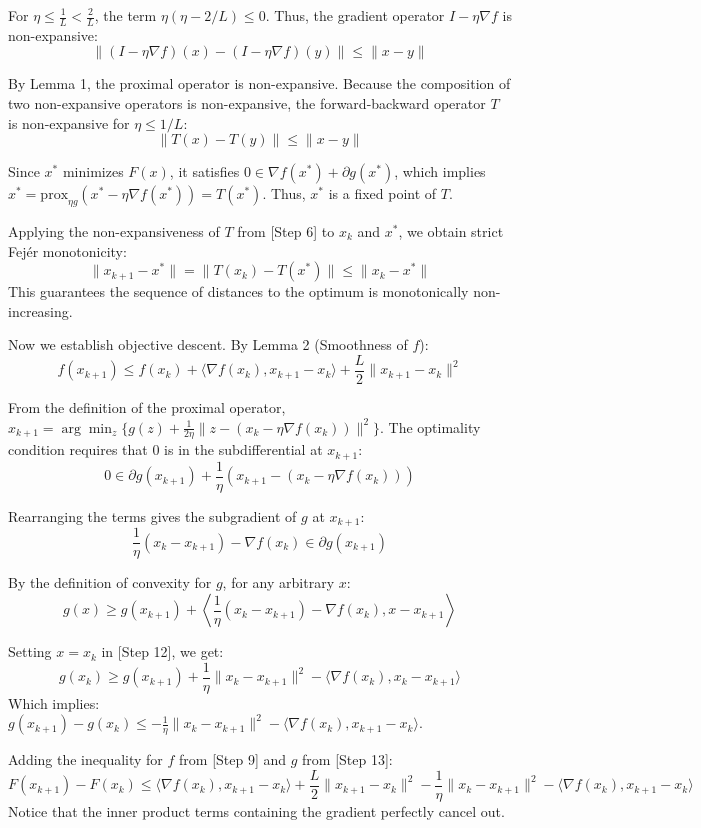 \documentclass[11pt]{article}
\begin{document}
\noindent [Step 5] For $\eta \le \frac{1}{L} < \frac{2}{L}$, the term $\eta(\eta - 2/L) \le 0$. Thus, the gradient operator $I - \eta \nabla f$ is non-expansive:
$$\|(I - \eta \nabla f)(x) - (I - \eta \nabla f)(y)\| \le \|x - y\|$$

\noindent [Step 6] By Lemma 1, the proximal operator is non-expansive. Because the composition of two non-expansive operators is non-expansive, the forward-backward operator $T$ is non-expansive for $\eta \le 1/L$:
$$\|T(x) - T(y)\| \le \|x - y\|$$

\noindent [Step 7] Since $x^*$ minimizes $F(x)$, it satisfies $0 \in \nabla f(x^*) + \partial g(x^*)$, which implies $x^* = \text{prox}_{\eta g}(x^* - \eta \nabla f(x^*)) = T(x^*)$. Thus, $x^*$ is a fixed point of $T$.

\noindent [Step 8] Applying the non-expansiveness of $T$ from [Step 6] to $x_k$ and $x^*$, we obtain strict Fejér monotonicity:
$$\|x_{k+1} - x^*\| = \|T(x_k) - T(x^*)\| \le \|x_k - x^*\|$$
This guarantees the sequence of distances to the optimum is monotonically non-increasing.

\noindent [Step 9] Now we establish objective descent. By Lemma 2 (Smoothness of $f$):
$$f(x_{k+1}) \le f(x_k) + \langle \nabla f(x_k), x_{k+1} - x_k \rangle + \frac{L}{2} \|x_{k+1} - x_k\|^2$$

\noindent [Step 10] From the definition of the proximal operator, $x_{k+1} = \arg\min_z \{ g(z) + \frac{1}{2\eta}\|z - (x_k - \eta \nabla f(x_k))\|^2 \}$. The optimality condition requires that $0$ is in the subdifferential at $x_{k+1}$:
$$0 \in \partial g(x_{k+1}) + \frac{1}{\eta}(x_{k+1} - (x_k - \eta \nabla f(x_k)))$$

\noindent [Step 11] Rearranging the terms gives the subgradient of $g$ at $x_{k+1}$:
$$\frac{1}{\eta}(x_k - x_{k+1}) - \nabla f(x_k) \in \partial g(x_{k+1})$$

\noindent [Step 12] By the definition of convexity for $g$, for any arbitrary $x$:
$$g(x) \ge g(x_{k+1}) + \left\langle \frac{1}{\eta}(x_k - x_{k+1}) - \nabla f(x_k), x - x_{k+1} \right\rangle$$

\noindent [Step 13] Setting $x = x_k$ in [Step 12], we get:
$$g(x_k) \ge g(x_{k+1}) + \frac{1}{\eta}\|x_k - x_{k+1}\|^2 - \langle \nabla f(x_k), x_k - x_{k+1} \rangle$$
Which implies: $g(x_{k+1}) - g(x_k) \le -\frac{1}{\eta}\|x_k - x_{k+1}\|^2 - \langle \nabla f(x_k), x_{k+1} - x_k \rangle$.

\noindent [Step 14] Adding the inequality for $f$ from [Step 9] and $g$ from [Step 13]:
$$F(x_{k+1}) - F(x_k) \le \langle \nabla f(x_k), x_{k+1} - x_k \rangle + \frac{L}{2} \|x_{k+1} - x_k\|^2 - \frac{1}{\eta}\|x_k - x_{k+1}\|^2 - \langle \nabla f(x_k), x_{k+1} - x_k \rangle$$
Notice that the inner product terms containing the gradient perfectly cancel out.
\end{document}
